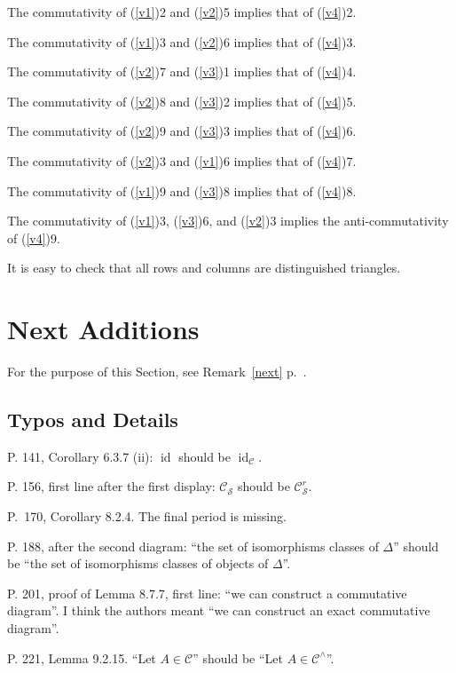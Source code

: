 \documentclass[12pt]{article}
\theoremstyle{remark}
\theoremstyle{definition}
\newcommand{\n}{\noindent}
\newcommand{\cc}{\mathcal}
\newcommand{\C}{\mathcal C}
\DeclareMathOperator{\id}{id}
\begin{document}
The commutativity of (\ref{v1})2 and (\ref{v2})5 implies that of (\ref{v4})2. 

The commutativity of (\ref{v1})3 and (\ref{v2})6 implies that of (\ref{v4})3.

The commutativity of (\ref{v2})7 and (\ref{v3})1 implies that of (\ref{v4})4.

The commutativity of (\ref{v2})8 and (\ref{v3})2 implies that of (\ref{v4})5. 

The commutativity of (\ref{v2})9 and (\ref{v3})3 implies that of (\ref{v4})6. 

The commutativity of (\ref{v2})3 and (\ref{v1})6 implies that of (\ref{v4})7. 

The commutativity of (\ref{v1})9 and (\ref{v3})8 implies that of (\ref{v4})8. 

The commutativity of (\ref{v1})3, (\ref{v3})6, and (\ref{v2})3 implies the anti-commutativity of (\ref{v4})9. 

It is easy to check that all rows and columns are distinguished triangles. 

\newpage

\section{Next Additions} %
%
For the purpose of this Section, see Remark~\ref{next} p.~\pageref{next}.
%
\subsection{Typos and Details} %
%
\n P. 141, Corollary 6.3.7 (ii): $\id$ should be $\id_\C$. 

\n P. 156, first line after the first display: $\C_{\cc S}$ should be $\C_{\cc S}^r$. 

\n P.~170, Corollary 8.2.4. The final period is missing. 

\n P. 188, after the second diagram: ``the set of isomorphisms classes of $\Delta$'' should be ``the set of isomorphisms classes of objects of $\Delta$''. 


\n P. 201, proof of Lemma 8.7.7, first line: ``we can construct a commutative diagram''. I think the authors meant ``we can construct an exact commutative diagram''. 

\n P. 221, Lemma 9.2.15. ``Let $A\in\C$'' should be ``Let $A\in\C^\wedge$''. 
\end{document}
